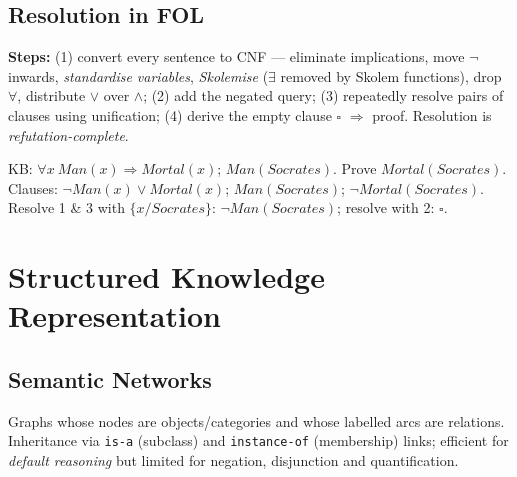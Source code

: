 \subsection{Resolution in FOL}
\textbf{Steps:} (1) convert every sentence to CNF --- eliminate implications, move $\neg$ inwards, \emph{standardise variables}, \emph{Skolemise} ($\exists$ removed by Skolem functions), drop $\forall$, distribute $\vee$ over $\wedge$; (2) add the negated query; (3) repeatedly resolve pairs of clauses using unification; (4) derive the empty clause $\square$ $\Rightarrow$ proof. Resolution is \emph{refutation-complete}.
\begin{example}
\small KB: $\forall x\ \textit{Man}(x)\Rightarrow\textit{Mortal}(x)$; $\textit{Man}(Socrates)$. Prove $\textit{Mortal}(Socrates)$.\\
Clauses: $\neg\textit{Man}(x)\vee\textit{Mortal}(x)$; $\textit{Man}(Socrates)$; $\neg\textit{Mortal}(Socrates)$.\\
Resolve 1 \& 3 with $\{x/Socrates\}$: $\neg\textit{Man}(Socrates)$; resolve with 2: $\square$. \checkmark
\end{example}

\section{Structured Knowledge Representation}
\subsection{Semantic Networks}
Graphs whose nodes are objects/categories and whose labelled arcs are relations. Inheritance via \texttt{is-a} (subclass) and \texttt{instance-of} (membership) links; efficient for \emph{default reasoning} but limited for negation, disjunction and quantification.
\begin{center}
\end{center}

